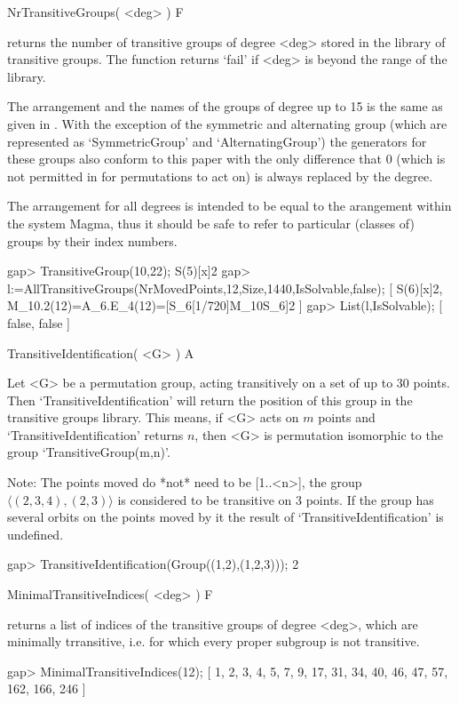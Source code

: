 \>NrTransitiveGroups( <deg> ) F

returns the number of transitive groups of degree <deg> stored in the
library of transitive groups. The function returns `fail' if <deg> is
beyond the range of the library.

The arrangement and the names of the groups of degree up to 15 is the same
as given in \cite{ConwayHulpkeMcKay98}. With the exception of the symmetric
and alternating group (which are represented as `SymmetricGroup' and
`AlternatingGroup') the generators for these groups also conform to this
paper with the only difference that 0 (which is not permitted in {\GAP} for
permutations to act on) is always replaced by the degree.

The arrangement for all degrees is intended to be equal to the arangement
within the system Magma, thus it should be safe to refer to particular
(classes of) groups by their index numbers.

\beginexample
gap> TransitiveGroup(10,22);
S(5)[x]2
gap> l:=AllTransitiveGroups(NrMovedPoints,12,Size,1440,IsSolvable,false);
[ S(6)[x]2, M_10.2(12)=A_6.E_4(12)=[S_6[1/720]{M_10}S_6]2 ]
gap> List(l,IsSolvable);
[ false, false ]
\endexample

\>TransitiveIdentification( <G> ) A

Let <G> be a permutation group, acting transitively on a set  of up to 30
points.  Then `TransitiveIdentification' will return the position of this
group in the transitive  groups library.  This means,  if <G> acts on
$m$ points and    `TransitiveIdentification'  returns $n$,  then <G>   is
permutation isomorphic to the group `TransitiveGroup(m,n)'.

Note: The points moved do *not* need to be [1..<n>], the group
$\langle (2,3,4),(2,3)\rangle$ is considered to be transitive on 3
points. If the group has several orbits on the points moved by it the
result of `TransitiveIdentification' is undefined.


\beginexample
gap> TransitiveIdentification(Group((1,2),(1,2,3)));
2
\endexample

\>MinimalTransitiveIndices( <deg> ) F

returns a list of indices of the transitive groups of degree <deg>, which
are minimally trransitive, i.e. for which every proper subgroup is not
transitive.

\beginexample
gap> MinimalTransitiveIndices(12);
[ 1, 2, 3, 4, 5, 7, 9, 17, 31, 34, 40, 46, 47, 57, 162, 166, 246 ]
\endexample


